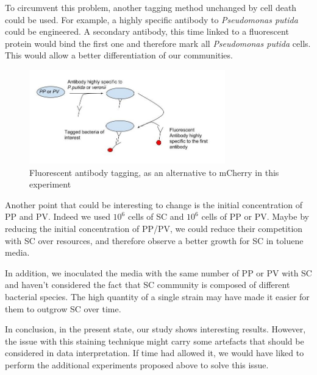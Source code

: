 \documentclass[a4paper, 10pt, conference]{ieeeconf}   %
\begin{document}
To circumvent this problem, another tagging method unchanged by cell death could be used. For example, a highly specific antibody to \textit{Pseudomonas putida} could be engineered. A secondary antibody, this time linked to a fluorescent protein would bind the first one and therefore mark all \textit{Pseudomonas putida} cells. This would allow a better differentiation of our communities.
\begin{figure}[H]
	\centering
	
	\includegraphics[width=8.5cm]{antibodytag.jpg}
	\caption{Fluorescent antibody tagging, as an alternative to mCherry in this experiment}
	\label{antibody}
	
\end{figure}
Another point that could be interesting to change is the initial concentration of PP and PV. Indeed we used $10^{6}$ cells of SC and $10^{6}$ cells of PP or PV. Maybe by reducing the initial concentration of PP/PV, we could reduce their competition with SC over resources, and therefore observe a better growth for SC in toluene media. 

In addition, we inoculated the media with the same number of PP or PV with SC and haven't considered the fact that SC community is composed of different bacterial species.
The high quantity of a single strain may have made it easier for them  to outgrow SC over time. 

%

In conclusion, in the present state, our study shows interesting results. However, the issue with this staining technique might carry some artefacts that should be considered in data interpretation. If time had allowed it, we would have liked to perform the additional experiments proposed above to solve this issue.
 
\end{document}

